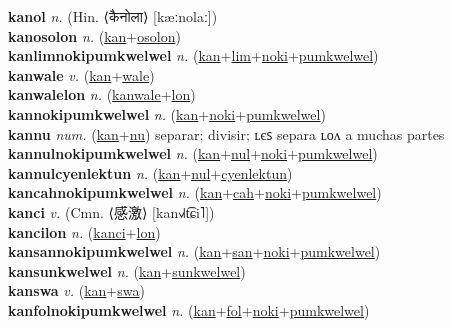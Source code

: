 \textbf{kanol} \textit{n.} (Hin. ⟨कैनोला⟩ [kæːnolaː])
 \label{kanol} \\
\textbf{kanosolon} \textit{n.} (\hyperref[kan]{kan}+\hyperref[osolon]{osolon})
 \label{kanosolon} \\
\textbf{kanlimnokipumkwelwel} \textit{n.} (\hyperref[kan]{kan}+\hyperref[lim]{lim}+\hyperref[noki]{noki}+\hyperref[pumkwelwel]{pumkwelwel})
 \label{kanlimnokipumkwelwel} \\
\textbf{kanwale} \textit{v.} (\hyperref[kan]{kan}+\hyperref[wale]{wale})
 \label{kanwale} \\
\textbf{kanwalelon} \textit{n.} (\hyperref[kanwale]{kanwale}+\hyperref[lon]{lon})
 \label{kanwalelon} \\
\textbf{kannokipumkwelwel} \textit{n.} (\hyperref[kan]{kan}+\hyperref[noki]{noki}+\hyperref[pumkwelwel]{pumkwelwel})
 \label{kannokipumkwelwel} \\
\textbf{kannu} \textit{num.} (\hyperref[kan]{kan}+\hyperref[nu]{nu})
separar; divisir; ʟєꜱ separa ʟᴏᴧ a muchas partes \label{kannu} \\
\textbf{kannulnokipumkwelwel} \textit{n.} (\hyperref[kan]{kan}+\hyperref[nul]{nul}+\hyperref[noki]{noki}+\hyperref[pumkwelwel]{pumkwelwel})
 \label{kannulnokipumkwelwel} \\
\textbf{kannulcyenlektun} \textit{n.} (\hyperref[kan]{kan}+\hyperref[nul]{nul}+\hyperref[cyenlektun]{cyenlektun})
 \label{kannulcyenlektun} \\
\textbf{kancahnokipumkwelwel} \textit{n.} (\hyperref[kan]{kan}+\hyperref[cah]{cah}+\hyperref[noki]{noki}+\hyperref[pumkwelwel]{pumkwelwel})
 \label{kancahnokipumkwelwel} \\
\textbf{kanci} \textit{v.} (Cmn. ⟨感激⟩ [kan˧˩˧t͡ɕi˥])
 \label{kanci} \\
\textbf{kancilon} \textit{n.} (\hyperref[kanci]{kanci}+\hyperref[lon]{lon})
 \label{kancilon} \\
\textbf{kansannokipumkwelwel} \textit{n.} (\hyperref[kan]{kan}+\hyperref[san]{san}+\hyperref[noki]{noki}+\hyperref[pumkwelwel]{pumkwelwel})
 \label{kansannokipumkwelwel} \\
\textbf{kansunkwelwel} \textit{n.} (\hyperref[kan]{kan}+\hyperref[sunkwelwel]{sunkwelwel})
 \label{kansunkwelwel} \\
\textbf{kanswa} \textit{v.} (\hyperref[kan]{kan}+\hyperref[swa]{swa})
 \label{kanswa} \\
\textbf{kanfolnokipumkwelwel} \textit{n.} (\hyperref[kan]{kan}+\hyperref[fol]{fol}+\hyperref[noki]{noki}+\hyperref[pumkwelwel]{pumkwelwel})
